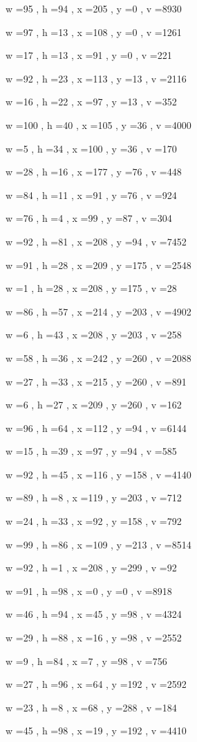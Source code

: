 \documentclass[11pt]{article}
\begin{document}
w =95 , h =94 , x =205 , y =0 , v =8930
\par
w =97 , h =13 , x =108 , y =0 , v =1261
\par
w =17 , h =13 , x =91 , y =0 , v =221
\par
w =92 , h =23 , x =113 , y =13 , v =2116
\par
w =16 , h =22 , x =97 , y =13 , v =352
\par
w =100 , h =40 , x =105 , y =36 , v =4000
\par
w =5 , h =34 , x =100 , y =36 , v =170
\par
w =28 , h =16 , x =177 , y =76 , v =448
\par
w =84 , h =11 , x =91 , y =76 , v =924
\par
w =76 , h =4 , x =99 , y =87 , v =304
\par
w =92 , h =81 , x =208 , y =94 , v =7452
\par
w =91 , h =28 , x =209 , y =175 , v =2548
\par
w =1 , h =28 , x =208 , y =175 , v =28
\par
w =86 , h =57 , x =214 , y =203 , v =4902
\par
w =6 , h =43 , x =208 , y =203 , v =258
\par
w =58 , h =36 , x =242 , y =260 , v =2088
\par
w =27 , h =33 , x =215 , y =260 , v =891
\par
w =6 , h =27 , x =209 , y =260 , v =162
\par
w =96 , h =64 , x =112 , y =94 , v =6144
\par
w =15 , h =39 , x =97 , y =94 , v =585
\par
w =92 , h =45 , x =116 , y =158 , v =4140
\par
w =89 , h =8 , x =119 , y =203 , v =712
\par
w =24 , h =33 , x =92 , y =158 , v =792
\par
w =99 , h =86 , x =109 , y =213 , v =8514
\par
w =92 , h =1 , x =208 , y =299 , v =92
\par
w =91 , h =98 , x =0 , y =0 , v =8918
\par
w =46 , h =94 , x =45 , y =98 , v =4324
\par
w =29 , h =88 , x =16 , y =98 , v =2552
\par
w =9 , h =84 , x =7 , y =98 , v =756
\par
w =27 , h =96 , x =64 , y =192 , v =2592
\par
w =23 , h =8 , x =68 , y =288 , v =184
\par
w =45 , h =98 , x =19 , y =192 , v =4410
\par
\newpage
\end{document}
